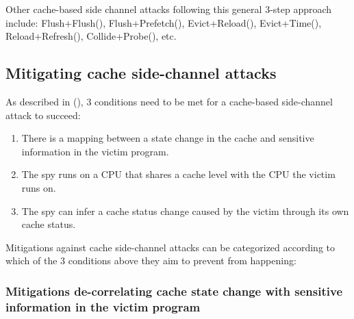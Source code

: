 \documentclass[
  a4paper,
]{report}
\providecommand{\tightlist}{%
  \setlength{\itemsep}{0pt}\setlength{\parskip}{0pt}}
\begin{document}
Other cache-based side channel attacks following this general 3-step
approach include:
\label{__index_entry_132}{Flush+Flush}(),
\label{__index_entry_133}{Flush+Prefetch}(),
\label{__index_entry_134}{Evict+Reload}(),
\label{__index_entry_135}{Evict+Time}(),
\label{__index_entry_136}{Reload+Refresh}(),
\label{__index_entry_137}{Collide+Probe}(), etc.

\subsection{Mitigating cache side-channel
attacks}\label{mitigating-cache-side-channel-attacks}

As described in (), 3 conditions
need to be met for a cache-based side-channel attack to succeed:

\begin{enumerate}
\def\labelenumi{\arabic{enumi}.}
\tightlist
\item
  There is a mapping between a state change in the cache and sensitive
  information in the victim program.
\item
  The spy runs on a CPU that shares a cache level with the CPU the
  victim runs on.
\item
  The spy can infer a cache status change caused by the victim through
  its own cache status.
\end{enumerate}

Mitigations against cache side-channel attacks can be categorized
according to which of the 3 conditions above they aim to prevent from
happening:

\subsubsection{Mitigations de-correlating cache state change with
sensitive information in the victim
program}\label{mitigations-de-correlating-cache-state-change-with-sensitive-information-in-the-victim-program}
\end{document}

